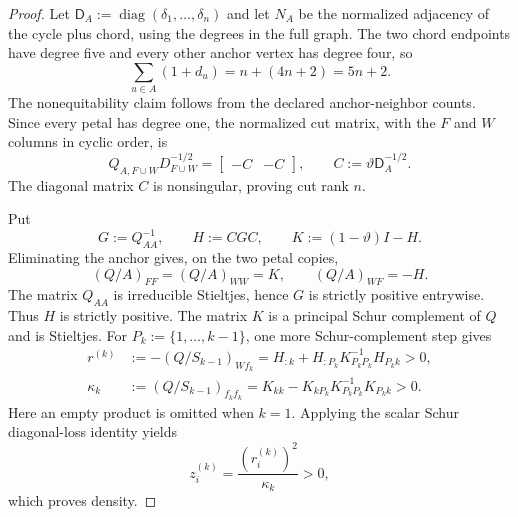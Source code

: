 \begin{proof}
Let $\mathsf D_A:=\operatorname{diag}(\delta_1,\ldots,\delta_n)$ and let
$N_A$ be the normalized adjacency of the cycle plus chord, using the degrees
in the full graph.  The two chord endpoints have degree five and every other
anchor vertex has degree four, so
\begin{equation*}
 \sum_{u\in A}(1+d_u)=n+(4n+2)=5n+2.
\end{equation*}
The nonequitability claim follows from the declared anchor-neighbor counts.
Since every petal has degree one, the normalized cut matrix, with the $F$
and $W$ columns in cyclic order, is
\begin{equation}
 Q_{A,F\cup W}D_{F\cup W}^{-1/2}
 =\begin{bmatrix}-C&-C\end{bmatrix},
 \qquad
 C:=\vartheta\mathsf D_A^{-1/2}.
 \label{eq:notched-sun-cut}
\end{equation}
The diagonal matrix $C$ is nonsingular, proving cut rank $n$.

Put
\begin{equation}
 G:=Q_{AA}^{-1},
 \qquad
 H:=CGC,
 \qquad
 K:=(1-\vartheta)I-H.
 \label{eq:notched-sun-green-blocks}
\end{equation}
Eliminating the anchor gives, on the two petal copies,
\begin{equation}
 (Q/A)_{FF}=(Q/A)_{WW}=K,
 \qquad
 (Q/A)_{WF}=-H.
 \label{eq:notched-sun-petal-schur}
\end{equation}
The matrix $Q_{AA}$ is irreducible Stieltjes, hence $G$ is strictly positive
entrywise.  Thus $H$ is strictly positive.  The matrix $K$ is a principal
Schur complement of $Q$ and is Stieltjes.  For
$P_k:=\{1,\ldots,k-1\}$, one more Schur-complement step gives
\begin{align}
 r^{(k)}
 &:=- (Q/S_{k-1})_{Wf_k}
   =H_{:k}+H_{:P_k}K_{P_kP_k}^{-1}H_{P_kk}>0,
 \label{eq:notched-sun-conditional-response}\\
 \kappa_k
 &:=(Q/S_{k-1})_{f_kf_k}
   =K_{kk}-K_{kP_k}K_{P_kP_k}^{-1}K_{P_kk}>0.
 \label{eq:notched-sun-conditional-pivot}
\end{align}
Here an empty product is omitted when $k=1$.  Applying the scalar Schur
diagonal-loss identity yields
\begin{equation}
 z_i^{(k)}=\frac{(r_i^{(k)})^2}{\kappa_k}>0,
 \label{eq:notched-sun-loss-factor}
\end{equation}
which proves density.


\end{proof}
